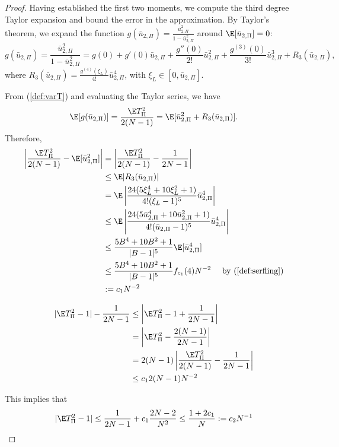 \begin{proof}
  Having established the first two moments, we compute the third degree Taylor expansion and bound
  the error in the approximation. By Taylor's theorem, we expand the function $g(\bar{u}_{2,\Pi}) =
  \frac{\bar{u}_{2,\Pi}^2}{1-\bar{u}_{2,\Pi}^2}$ around $\E[\bar{u}_{2,\Pi}] = 0$: 
  \begin{equation*}
    g(\bar{u}_{2,\Pi}) = \frac{\bar{u}_{2,\Pi}^2}{1-\bar{u}_{2,\Pi}^2} = g(0) + g'(0)
    \bar{u}_{2,\Pi} + \frac{g''(0)}{2!}\bar{u}_{2,\Pi}^2 +
    \frac{g^{(3)}(0)}{3!}\bar{u}_{2,\Pi}^3 + R_3(\bar{u}_{2,\Pi}),
  \end{equation*}
  where $R_3(\bar{u}_{2,\Pi}) = \frac{g^{(4)}(\xi_L)}{4!}\bar{u}_{2,\Pi}^4$, with
  $\xi_L \in [0, \bar{u}_{2,\Pi}]$.

  From (\ref{def:varT}) and evaluating the Taylor series, we have 
  \begin{equation*}
    \E[g(\bar{u}_{2,\Pi})] = \frac{\E T_{\Pi}^2}{2(N-1)} = \E[\bar{u}_{2,\Pi}^2 + R_3(\bar{u}_{2,\Pi})].
  \end{equation*}
  Therefore,
  \begin{align*}
    \left | \frac{\E T_{\Pi}^2}{2(N-1)} - \E[\bar{u}_{2,\Pi}^2] \right | 
    &= \left | \frac{\E T_{\Pi}^2}{2(N-1)} - \frac{1}{2N-1} \right | \\
    &\leq  \E |R_3(\bar{u}_{2,\Pi})| \\
    &= \E \left | \frac{24(5\xi_L^4 + 10 \xi_L^2 +
        1)}{4!(\xi_L-1)^5}\bar{u}_{2,\Pi}^4 \right | \\
    &\leq \E \left | \frac{24(5\bar{u}_{2,\Pi}^4 + 10 \bar{u}_{2,\Pi}^2 +
        1)}{4!(\bar{u}_{2,\Pi}-1)^5}\bar{u}_{2,\Pi}^4 \right | \\
    &\leq \frac{5B^4+10B^2+1}{|B-1|^5} \E [\bar{u}_{2,\Pi}^4] \\
    &\leq \frac{5B^4+10B^2+1}{|B-1|^5} f_{c_1}(4) N^{-2} \quad \text{
      by } (\ref{def:serfling}) \\
    &:= c_1 N^{-2}
  \end{align*}
  
  \begin{align*}
    |\E T_{\Pi}^2 - 1| - \frac{1}{2N-1} 
    &\leq \left | \E T_{\Pi}^2 - 1 + \frac{1}{2N-1} \right | \\
    &= \left | \E T_{\Pi}^2 - \frac{2(N-1)}{2N-1} \right | \\
    &= 2(N-1) \left | \frac{\E T_{\Pi}^2}{2(N-1)} - \frac{1}{2N-1} \right | \\
    &\leq c_1 2(N-1)N^{-2}
  \end{align*}
  
  This implies that 
  \begin{equation*}
    |\E T_{\Pi}^2 - 1| \leq \frac{1}{2N-1} + c_1 \frac{2N-2}{N^2} \leq
    \frac{1 + 2c_1}{N} := c_2 N^{-1}
  \end{equation*}
\end{proof}

